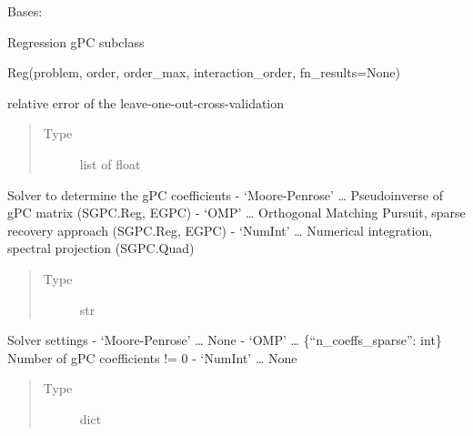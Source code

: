 \documentclass[letterpaper,10pt,english,openany,oneside]{sphinxmanual}
\begin{document}
\begin{fulllineitems}
\label{\detokenize{pygpc:pygpc.SGPC.Reg}}
Bases: {\hyperref[\detokenize{pygpc:pygpc.SGPC.SGPC}]{}}

Regression gPC subclass

Reg(problem, order, order\_max, interaction\_order, fn\_results=None)

\begin{fulllineitems}
\label{\detokenize{pygpc:pygpc.SGPC.Reg.relative_error_loocv}}
relative error of the leave-one-out-cross-validation
\begin{quote}\begin{description}
\item[{Type}] \leavevmode
list of float

\end{description}\end{quote}

\end{fulllineitems}


\begin{fulllineitems}
\label{\detokenize{pygpc:pygpc.SGPC.Reg.solver}}
Solver to determine the gPC coefficients
- ‘Moore-Penrose’ … Pseudoinverse of gPC matrix (SGPC.Reg, EGPC)
- ‘OMP’ … Orthogonal Matching Pursuit, sparse recovery approach (SGPC.Reg, EGPC)
- ‘NumInt’ … Numerical integration, spectral projection (SGPC.Quad)
\begin{quote}\begin{description}
\item[{Type}] \leavevmode
str

\end{description}\end{quote}

\end{fulllineitems}


\begin{fulllineitems}
\label{\detokenize{pygpc:pygpc.SGPC.Reg.settings}}
Solver settings
- ‘Moore-Penrose’ … None
- ‘OMP’ … \{“n\_coeffs\_sparse”: int\} Number of gPC coefficients != 0
- ‘NumInt’ … None
\begin{quote}\begin{description}
\item[{Type}] \leavevmode
dict


\end{description}
\end{quote}
\end{fulllineitems}
\end{fulllineitems}
\end{document}
